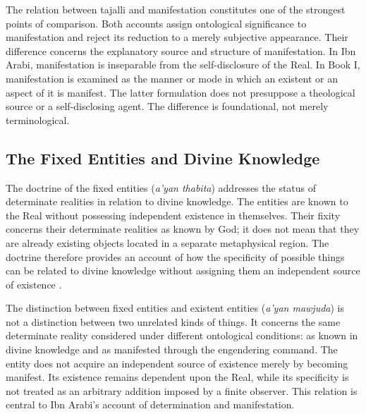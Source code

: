 \label{para:VS.B01.P01.C08.SS07.P004}

The relation between tajalli and manifestation
constitutes one of the strongest points of comparison.
Both accounts assign ontological significance to
manifestation and reject its reduction to a merely
subjective appearance. Their difference concerns
the explanatory source and structure of manifestation.
In Ibn Arabi, manifestation is inseparable from the
self-disclosure of the Real. In Book I, manifestation
is examined as the manner or mode in which an existent
or an aspect of it is manifest. The latter formulation
does not presuppose a theological source or a
self-disclosing agent. The difference is foundational,
not merely terminological.



\subsection{The Fixed Entities and Divine Knowledge}
\label{subsec:ch08_s16_ss08}

\label{para:VS.B01.P01.C08.S16.SS08.P001}

The doctrine of the fixed entities
(\textit{a'yan thabita}) addresses the status of
determinate realities in relation to divine knowledge.
The entities are known to the Real without possessing
independent existence in themselves. Their fixity
concerns their determinate realities as known by
God; it does not mean that they are already existing
objects located in a separate metaphysical region.
The doctrine therefore provides an account of how
the specificity of possible things can be related
to divine knowledge without assigning them an
independent source of existence
\citep{ChittickSufiPathKnowledge1989}.

\label{para:VS.B01.P01.C08.SS08.P002}

The distinction between fixed entities and existent
entities (\textit{a'yan mawjuda}) is not a distinction
between two unrelated kinds of things. It concerns
the same determinate reality considered under
different ontological conditions: as known in divine
knowledge and as manifested through the engendering
command. The entity does not acquire an independent
source of existence merely by becoming manifest.
Its existence remains dependent upon the Real, while
its specificity is not treated as an arbitrary
addition imposed by a finite observer. This relation
is central to Ibn Arabi's account of determination
and manifestation.

